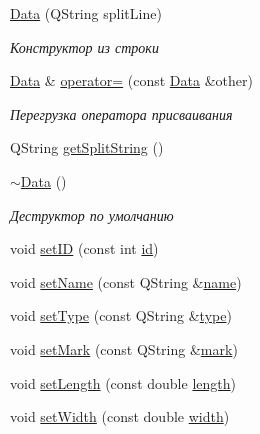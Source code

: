 \begin{DoxyCompactItemize}
\mbox{\hyperlink{class_data_a9237598fe3cfc3595f10cfeec8a978ea}{Data}} (Q\+String split\+Line)
\begin{DoxyCompactList}\small\item\em Конструктор из строки \end{DoxyCompactList}\item 
\mbox{\label{class_data_ac5e314c7b80a4a7fcecb4c7cb0b40783}} 
\mbox{\hyperlink{class_data}{Data}} \& \mbox{\hyperlink{class_data_ac5e314c7b80a4a7fcecb4c7cb0b40783}{operator=}} (const \mbox{\hyperlink{class_data}{Data}} \&other)
\begin{DoxyCompactList}\small\item\em Перегрузка оператора присваивания \end{DoxyCompactList}\item 
Q\+String \mbox{\hyperlink{class_data_a1335dbd643f8324782c0a219b6acb0d5}{get\+Split\+String}} ()
\item 
\mbox{\label{class_data_aab31956423290f0d62dcca47ab4d16dd}} 
\mbox{\hyperlink{class_data_aab31956423290f0d62dcca47ab4d16dd}{$\sim$\+Data}} ()
\begin{DoxyCompactList}\small\item\em Деструктор по умолчанию \end{DoxyCompactList}\item 
void \mbox{\hyperlink{class_data_a9ae14fe40ea3487fd8a1571a592b8946}{set\+ID}} (const int \mbox{\hyperlink{class_data_a1038027623494cd8010c2da6dc4931cf}{id}})
\item 
void \mbox{\hyperlink{class_data_a63fd8adda08203af08e494d077435e98}{set\+Name}} (const Q\+String \&\mbox{\hyperlink{class_data_a26474da0b1d12f2c859c3f5c1b0319cd}{name}})
\item 
void \mbox{\hyperlink{class_data_a19f337326148f1060cce20ac4d4206fb}{set\+Type}} (const Q\+String \&\mbox{\hyperlink{class_data_af9f18d58205e8ffe53ef3ebd7142df39}{type}})
\item 
void \mbox{\hyperlink{class_data_a0b07ef4a07565d84e5e2e44cd2df028f}{set\+Mark}} (const Q\+String \&\mbox{\hyperlink{class_data_ac42443978dbd444351eaa3411dd2eb29}{mark}})
\item 
void \mbox{\hyperlink{class_data_ad917f08da918d183b2a8520b8fcc8ae0}{set\+Length}} (const double \mbox{\hyperlink{class_data_a99618bdc2d9259373ecdf185f75caabf}{length}})
\item 
void \mbox{\hyperlink{class_data_a2ef017807f602292f5d05d9114ee41e5}{set\+Width}} (const double \mbox{\hyperlink{class_data_ae7a24cb64fc28f87f3b2cd1b0a447d25}{width}})

\end{DoxyCompactItemize}
